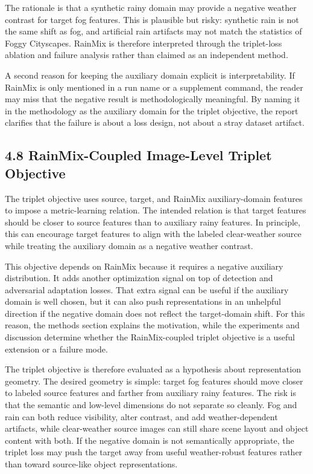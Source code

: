 \documentclass[
  11pt,
]{article}
\begin{document}
The rationale is that a synthetic rainy domain may provide a negative
weather contrast for target fog features. This is plausible but risky:
synthetic rain is not the same shift as fog, and artificial rain
artifacts may not match the statistics of Foggy Cityscapes. RainMix is
therefore interpreted through the triplet-loss ablation and failure
analysis rather than claimed as an independent method.

A second reason for keeping the auxiliary domain explicit is
interpretability. If RainMix is only mentioned in a run name or a
supplement command, the reader may miss that the negative result is
methodologically meaningful. By naming it in the methodology as the
auxiliary domain for the triplet objective, the report clarifies that
the failure is about a loss design, not about a stray dataset artifact.

\hypertarget{rainmix-coupled-image-level-triplet-objective}{%
\subsection{4.8 RainMix-Coupled Image-Level Triplet
Objective}\label{rainmix-coupled-image-level-triplet-objective}}

The triplet objective uses source, target, and RainMix auxiliary-domain
features to impose a metric-learning relation. The intended relation is
that target features should be closer to source features than to
auxiliary rainy features. In principle, this can encourage target
features to align with the labeled clear-weather source while treating
the auxiliary domain as a negative weather contrast.

This objective depends on RainMix because it requires a negative
auxiliary distribution. It adds another optimization signal on top of
detection and adversarial adaptation losses. That extra signal can be
useful if the auxiliary domain is well chosen, but it can also push
representations in an unhelpful direction if the negative domain does
not reflect the target-domain shift. For this reason, the methods
section explains the motivation, while the experiments and discussion
determine whether the RainMix-coupled triplet objective is a useful
extension or a failure mode.

The triplet objective is therefore evaluated as a hypothesis about
representation geometry. The desired geometry is simple: target fog
features should move closer to labeled source features and farther from
auxiliary rainy features. The risk is that the semantic and low-level
dimensions do not separate so cleanly. Fog and rain can both reduce
visibility, alter contrast, and add weather-dependent artifacts, while
clear-weather source images can still share scene layout and object
content with both. If the negative domain is not semantically
appropriate, the triplet loss may push the target away from useful
weather-robust features rather than toward source-like object
representations.
\end{document}
